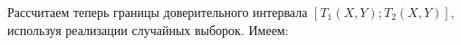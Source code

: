 \documentclass{article}
\begin{document}
Рассчитаем теперь границы доверительного интервала $\left[T_{1}(X, Y); T_{2}(X, Y)\right]$, используя реализации случайных выборок. Имеем:



\end{document}
